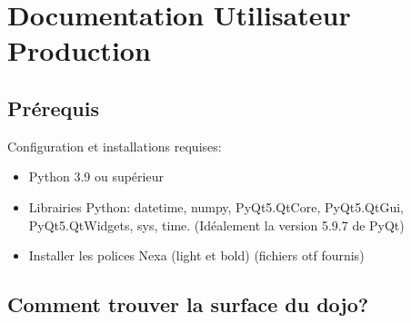 \section{Documentation Utilisateur Production}

\subsection{Prérequis}

Configuration et installations requises:

\begin{itemize}
    \item Python 3.9 ou supérieur
    \item Librairies Python: datetime, numpy, PyQt5.QtCore, PyQt5.QtGui, PyQt5.QtWidgets, sys, time.
          (Idéalement la version 5.9.7 de PyQt)
    \item Installer les polices Nexa (light et bold) (fichiers otf fournis)
\end{itemize}


\subsection{Comment trouver la surface du dojo?}


